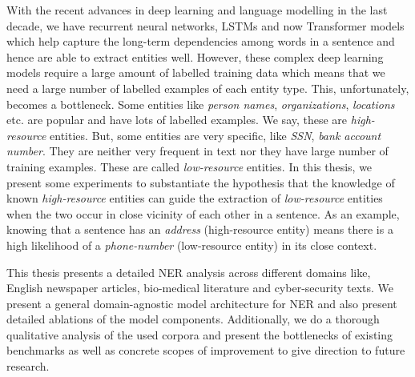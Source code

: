 With the recent advances in deep learning and language modelling in the last decade, we have recurrent neural networks, LSTMs and now Transformer models which help capture the long-term dependencies among words in a sentence and hence are able to extract entities well. However, these complex deep learning models require a large amount of labelled training data which means that we need a large number of labelled examples of each entity type. This, unfortunately, becomes a bottleneck. Some entities like \textit{person names}, \textit{organizations}, \textit{locations} etc. are popular and have lots of labelled examples. We say, these are \textit{high-resource} entities. But, some entities are very specific, like \textit{SSN}, \textit{bank account number}. They are neither very frequent in text nor they have large number of training examples. These are called \textit{low-resource} entities. In this thesis, we present some experiments to substantiate the hypothesis that the knowledge of known \textit{high-resource} entities can guide the extraction of \textit{low-resource} entities when the two occur in close vicinity of each other in a sentence. As an example, knowing that a sentence has an \textit{address} (high-resource entity) means there is a high likelihood of a \textit{phone-number} (low-resource entity) in its close context.

This thesis presents a detailed NER analysis across different domains like, English newspaper articles, bio-medical literature and cyber-security texts. We present a general domain-agnostic model architecture for NER and also present detailed ablations of the model components. Additionally, we do a thorough qualitative analysis of the used corpora and present the bottlenecks of existing benchmarks as well as concrete scopes of improvement to give direction to future research.